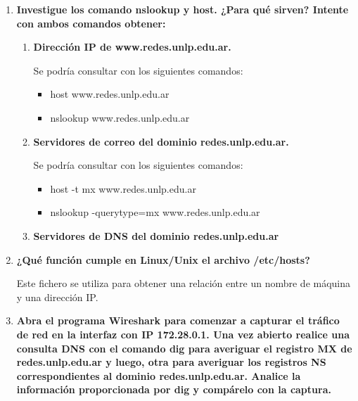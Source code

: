 \documentclass[a4paper,10pt]{article}
\begin{document}
\begin{enumerate}
        \item \textbf{Investigue los comando nslookup y host. ¿Para qué sirven? Intente con ambos comandos obtener:}
        
            \begin{enumerate}
                \item \textbf{Dirección IP de www.redes.unlp.edu.ar.}
                
                    Se podría consultar con los siguientes comandos:
                    \begin{itemize}
                        \item host www.redes.unlp.edu.ar
                        \item nslookup www.redes.unlp.edu.ar
                    \end{itemize}
                
                \item \textbf{Servidores de correo del dominio redes.unlp.edu.ar.}
                
                    Se podría consultar con los siguientes comandos:
                    \begin{itemize}
                        \item host -t mx www.redes.unlp.edu.ar
                        \item nslookup -querytype=mx www.redes.unlp.edu.ar
                    \end{itemize}
                    
                \item \textbf{Servidores de DNS del dominio redes.unlp.edu.ar}
            \end{enumerate}
        
        \item \textbf{ ¿Qué función cumple en Linux/Unix el archivo /etc/hosts?}
        
        Este fichero se utiliza para obtener una relación entre un nombre de máquina y una dirección IP.
        
        \item \textbf{Abra el programa Wireshark para comenzar a capturar el tráfico de red en la interfaz con IP 172.28.0.1. Una vez abierto realice una consulta DNS con el comando dig para averiguar el registro MX de redes.unlp.edu.ar y luego, otra para averiguar los registros NS correspondientes al dominio redes.unlp.edu.ar. Analice la información proporcionada por dig y compárelo con la captura.}
    \end{enumerate}
\end{document}
